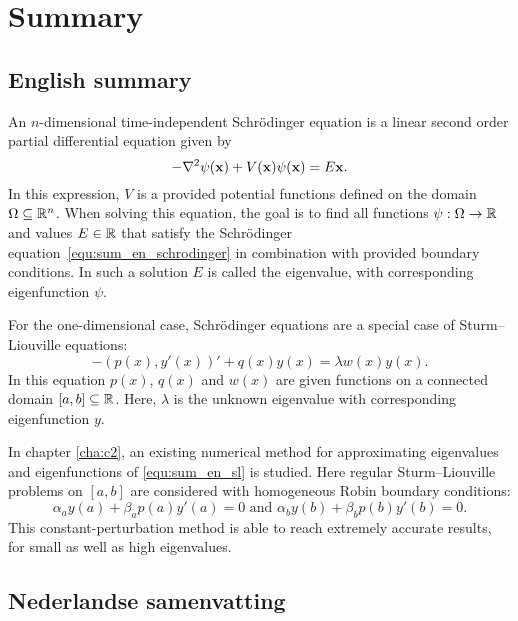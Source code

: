 


\chapter*{Summary}


\section*{English summary}

An $n$-dimensional time-independent Schrödinger equation is a linear second order partial differential equation given by
\begin{equation}\label{equ:sum_en_schrodinger}
-\nabla^2 \psi(\vb{x}) + V(\vb{x}) \psi(\vb{x}) = E\vb{x}\text{.}
\end{equation}
In this expression, $V$ is a provided potential functions defined on the domain $\Omega \subseteq \mathbb{R}^n$. When solving this equation, the goal is to find all functions $\psi : \Omega \to \mathbb{R}$ and values $E \in \mathbb{R}$ that satisfy the Schrödinger equation~\eqref{equ:sum_en_schrodinger} in combination with provided boundary conditions. In such a solution $E$ is called the eigenvalue, with corresponding eigenfunction $\psi$.

For the one-dimensional case, Schrödinger equations are a special case of Sturm--Liouville equations:
\begin{equation}\label{equ:sum_en_sl}
    -(p(x), y'(x))' + q(x) y(x) = \lambda w(x) y(x) \text{.}
\end{equation}
In this equation $p(x)$, $q(x)$ and $w(x)$ are given functions on a connected domain $[a, b] \subseteq \mathbb{R}$. Here, $\lambda$ is the unknown eigenvalue with corresponding eigenfunction $y$.

In chapter \ref{cha:c2}, an existing numerical method for approximating eigenvalues and eigenfunctions of \eqref{equ:sum_en_sl} is studied. Here regular Sturm--Liouville problems on $[a, b]$ are considered with homogeneous Robin boundary conditions:
$$
\alpha_a y(a) + \beta_a p(a) y'(a) = 0 \text{ and } \alpha_b y(b) + \beta_b p(b) y'(b) = 0\text{.}
$$
This constant-perturbation method is able to reach extremely accurate results, for small as well as high eigenvalues.



\section*{Nederlandse samenvatting}


\stopchapter
